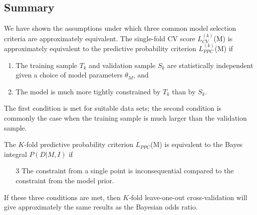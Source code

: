 \documentclass[12pt]{article}
\newcommand{\LCVk}[1]{\ensuremath{L^{(k)}_{CV}}(#1)}
\newcommand{\LPPC}[1]{\ensuremath{L_{PPC}}(#1)}
\newcommand{\LPPCk}[1]{\ensuremath{L^{(k)}_{PPC}}(#1)}
\begin{document}
\subsection{Summary}
We have shown the assumptions under which three common model selection criteria
are approximately equivalent.  The single-fold CV score \LCVk{M}
is approximately equivalent to the predictive probability criterion
\LPPCk{M} if
\begin{enumerate}
  \item The training sample $T_k$ and validation sample $S_k$ are statistically
    independent given a choice of model parameters $\theta_M$, and
  \item The model is much more tightly constrained by $T_k$ than by $S_k$.
\end{enumerate}
The first condition is met for suitable data sets; the second condition is
commonly the case when the training sample is much larger than the validation
sample.

The $K$-fold predictive probability criterion \LPPC{M} is equivalent to
the Bayes integral $P(D|M,I)$ if
\begin{enumerate}
  \item[3] The constraint from a single point is inconsequential compared
    to the constraint from the model prior.
\end{enumerate}
If these three conditions are met, then $K$-fold leave-one-out cross-validation
will give approximately the same results as the Bayesian odds ratio.
\end{document}
